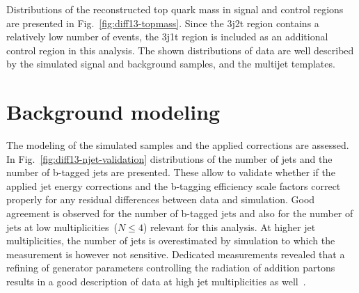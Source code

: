 Distributions of the reconstructed top quark mass in signal and control regions are presented in Fig.~\ref{fig:diff13-topmass}. Since the 3j2t region contains a relatively low number of events, the 3j1t region is included as an additional \ttbar control region in this analysis. The shown distributions of data are well described by the simulated signal and background samples, and the multijet templates.

 


\section{Background modeling}
\label{sec:diff13-modeling}

The modeling of the simulated samples and the applied corrections are assessed. In Fig.~\ref{fig:diff13-njet-validation} distributions of the number of jets and the number of b-tagged jets are presented. These allow to validate whether if the applied jet energy corrections and the b-tagging efficiency scale factors correct properly for any residual differences between data and simulation. Good agreement is observed for the number of b-tagged jets and also for the number of jets at low multiplicities~($N\leq4$) relevant for this analysis. At higher jet multiplicities, the number of jets is overestimated by simulation to which the measurement is however not sensitive. Dedicated \ttbar measurements revealed that a refining of generator parameters controlling the radiation of addition partons results in a good description of data at high jet multiplicities as well~\cite{CMS-PAS-TOP-16-021}.


